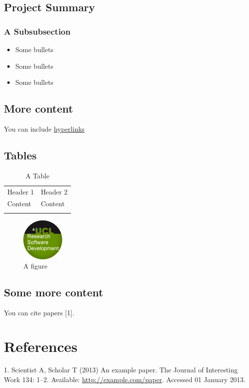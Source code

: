 \documentclass[]{scrartcl}
\makeatletter
\def\maxwidth{\ifdim\Gin@nat@width>\linewidth\linewidth
\else\Gin@nat@width\fi}
\let\Oldincludegraphics\includegraphics
\renewcommand{\includegraphics}[1]{\Oldincludegraphics[width=\maxwidth]{#1}}
\makeatother
\begin{document}
\subsection{Project Summary}\label{project-summary}

\subsubsection{A Subsubsection}\label{a-subsubsection}

\begin{itemize}
\itemsep1pt\parskip0pt
\item
  Some bullets
\item
  Some bullets
\item
  Some bullets
\end{itemize}

\subsection{More content}\label{more-content}

You can include \href{http://example.com}{hyperlinks}

\subsection{Tables}\label{tables}

\begin{longtable}[c]{@{}ll@{}}
\hline\noalign{\medskip}
Header 1 & Header 2
\\\noalign{\medskip}
\hline\noalign{\medskip}
Content & Content
\\\noalign{\medskip}
\hline
\noalign{\medskip}
\caption{\label{Table} A Table}
\end{longtable}

\begin{figure}[htbp]
\centering
\includegraphics{figure.png}
\caption{\label{Figure} A figure}
\end{figure}

\subsection{Some more content}\label{some-more-content}

You can cite papers {[}1{]}.

\section{References}\label{references}

1. Scientist A, Scholar T (2013) An example paper. The Journal of
Interesting Work 134: 1--2. Available: \url{http://example.com/paper}.
Accessed 01 January 2013.
\end{document}
